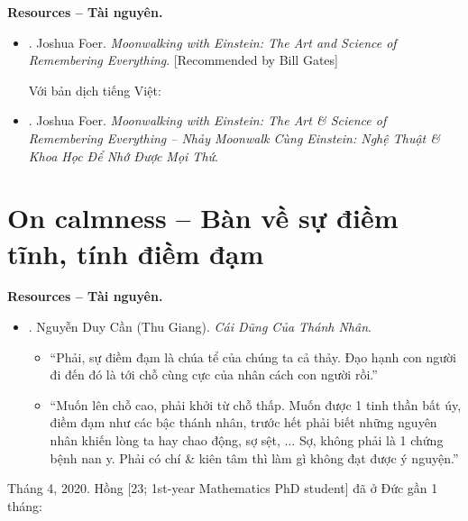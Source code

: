 \documentclass[12pt,oneside]{book}
\begin{document}
\noindent\textbf{\textsf{Resources -- Tài nguyên.}}
\begin{itemize}
	\item \cite{Foer_remember}. {\sc Joshua Foer}. {\it Moonwalking with Einstein: The Art and Science of Remembering Everything}. [Recommended by {\sc Bill Gates}]
	
	Với bản dịch tiếng Việt:
	\item \cite{Foer_remember_VN}. {\sc Joshua Foer}. {\it Moonwalking with Einstein: The Art \& Science of Remembering Everything -- Nhảy Moonwalk Cùng Einstein: Nghệ Thuật \& Khoa Học Để Nhớ Được Mọi Thứ}.
\end{itemize}

\section{On calmness -- Bàn về sự điềm tĩnh, tính điềm đạm}
{\bf \textsf{Resources -- Tài nguyên.}}
\begin{itemize}
	\item \cite{Can_dung_thanh_nhan}. {\sc Nguyễn Duy Cần (Thu Giang)}. {\it Cái Dũng Của Thánh Nhân}.
	\begin{itemize}
		\item ``Phải, sự điềm đạm là chúa tể của chúng ta cả thảy. Đạo hạnh con người đi đến đó là tới chỗ cùng cực của nhân cách con người rồi.''
		
		\item ``Muốn lên chỗ cao, phải khởi từ chỗ thấp. Muốn được 1 tinh thần bất úy, điềm đạm như các bậc thánh nhân, trước hết phải biết những nguyên nhân khiến lòng ta hay chao động, sợ sệt, $\ldots$ Sợ, không phải là 1 chứng bệnh nan y. Phải có chí \& kiên tâm thì làm gì không đạt được ý nguyện.''
	\end{itemize}
\end{itemize}
Tháng 4, 2020. {\sf Hồng [23; 1st-year Mathematics PhD student]} đã ở Đức gần 1 tháng:
\end{document}
